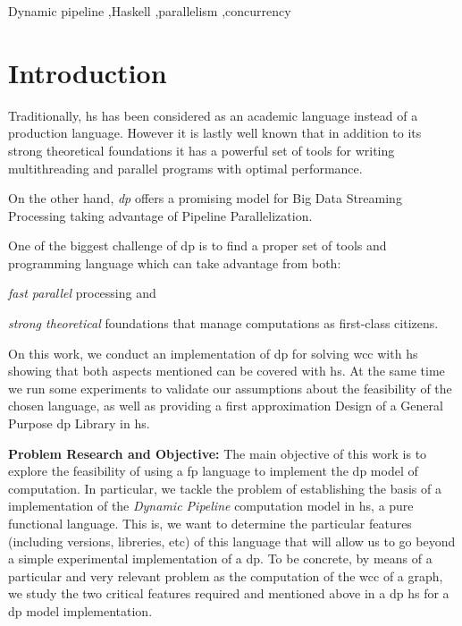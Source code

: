 \documentclass[preprint]{elsarticle}
\begin{document}
\begin{keyword}
Dynamic pipeline \sep Haskell \sep parallelism \sep concurrency
\end{keyword}

\maketitle

\section{Introduction}
Traditionally, \acrfull{hs} has been considered as an academic language instead of a production language. However it is lastly well known that in addition to its strong theoretical foundations it has a powerful set of tools for writing multithreading and parallel programs with optimal performance.

On the other hand, \textit{\acrfull{dp}} \cite{dpdef} offers a promising model for Big Data Streaming Processing taking advantage of Pipeline Parallelization. 

One of the biggest challenge of \acrshort{dp} is to find a proper set of tools and programming language which can take advantage from both: \begin{inparaenum}[i\upshape)]
\item  \emph{fast parallel} processing and 
\item  \emph{strong theoretical} foundations that manage computations as first-class citizens.
 \end{inparaenum}

On this work, we conduct an implementation of \acrshort{dp} for solving \acrfull{wcc} with \acrshort{hs} showing that both aspects mentioned can be covered with \acrshort{hs}. At the same time we run some experiments to validate our assumptions about the feasibility of the chosen language, as well as providing a first approximation Design of a General Purpose \acrshort{dp} Library in \acrshort{hs}.

\textbf{Problem Research and Objective:}\label{research:obj} The main objective of this work is to explore the feasibility of using a  \acrfull{fp} language to implement the \acrfull{dp} model of computation. In particular, we tackle the problem of establishing the basis of a implementation of the \emph{Dynamic Pipeline} computation model in \acrfull{hs}, a pure functional language. This is,  we want to determine the particular features (including versions, libreries, etc) of this language that will allow us to go beyond a simple experimental implementation of a \acrshort{dp}. To be concrete, by means of a particular and very relevant problem as the computation of the \acrfull{wcc} of a graph,  we study the two critical features required and mentioned above in a \acrshort{dp} \acrshort{hs} for a \acrshort{dp} model implementation.
\end{document}
